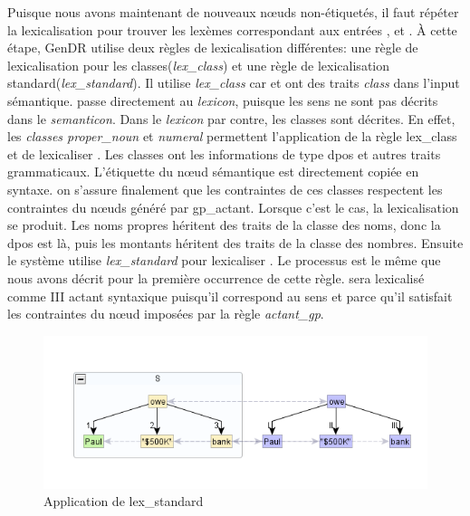 Puisque nous avons maintenant de nouveaux n\oe{}uds non-étiquetés, il faut répéter la lexicalisation pour trouver les lexèmes correspondant aux entrées ,  et . À cette étape, GenDR utilise deux règles de lexicalisation différentes: une règle de lexicalisation pour les classes(\emph{lex\_class}) et une règle de lexicalisation standard(\emph{lex\_standard}). Il utilise \emph{lex\_class} car  et  ont des traits \emph{class} dans l'input sémantique.  passe directement au \emph{lexicon}, puisque les sens ne sont pas décrits dans le \emph{semanticon}. Dans le \emph{lexicon} par contre, les classes sont décrites. En effet, les \emph{classes proper\_noun} et \emph{numeral} permettent l'application de la règle lex\_class et de lexicaliser . Les classes ont les informations de type dpos et autres traits grammaticaux. L'étiquette du n\oe{}ud sémantique est directement copiée en syntaxe. on s'assure finalement que les contraintes de ces classes respectent les contraintes du n\oe{}uds généré par gp\_actant. Lorsque c'est le cas, la lexicalisation se produit. Les noms propres héritent des traits de la classe des noms, donc la dpos est là, puis les montants héritent des traits de la classe des nombres. Ensuite le système utilise \emph{lex\_standard} pour lexicaliser . Le processus est le même que nous avons décrit pour la première occurrence de cette règle. sera lexicalisé comme III actant syntaxique puisqu'il correspond au sens  et parce qu'il satisfait les contraintes du n\oe{}ud imposées par la règle \emph{actant\_gp}.

\begin{figure}[htb]
	\centering
	\includegraphics[width=1\textwidth, trim = {0cm 0cm 0cm 0cm},clip]{ch3/figs/lex_standard2.png}
	\caption{Application de lex\_standard}
	\label{fig:lexstand2}
\end{figure}

